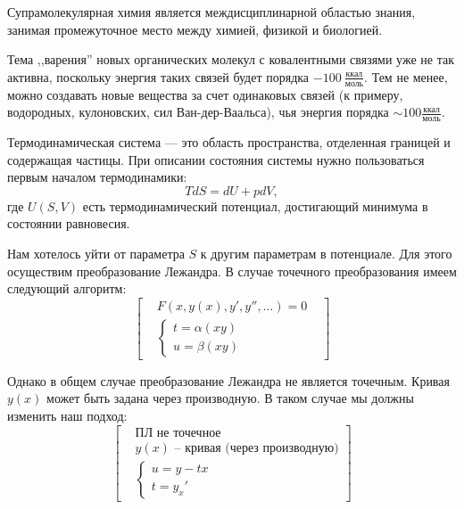 
\begin{lecture}
	Супрамолекулярная химия является междисциплинарной областью знания, занимая промежуточное место между химией, физикой и биологией.
		
	Тема ,,варения'' новых органических молекул с ковалентными связями уже не так активна, поскольку энергия таких связей будет порядка $-100~\frac{\text{ккал}}{\text{моль}}$.
    Тем не менее, можно создавать новые вещества за счет одинаковых связей (к примеру, водородных, кулоновских, сил Ван-дер-Ваальса), чья энергия порядка
    $ \sim 100 \frac{\text{ккал}}{\text{моль}}$.
    
    Термодинамическая система --- это область пространства, отделенная границей и содержащая частицы.
    При описании состояния системы нужно пользоваться первым началом термодинамики:
    \begin{equation}
    	T dS = dU + p dV,
    	\label{eq:first_statement_therm}
    \end{equation}
    где $U (S, V)$ есть термодинамический потенциал, достигающий минимума в состоянии равновесия.
    
    Нам хотелось уйти от параметра $S$ к другим параметрам в потенциале. Для этого осуществим преобразование Лежандра. В случае точечного преобразования имеем следующий алгоритм:
    \begin{equation}
    	\begin{bmatrix}
			&F( x, y(x), y', y'', \dots ) = 0 & \\
			&\begin{cases}
				t = \alpha (xy) \\
				u = \beta (xy)
			\end{cases}
		\end{bmatrix}
		\label{eq:dot_lejandr}
    \end{equation}
    
    Однако в общем случае преобразование Лежандра не является точечным. Кривая $ y(x) $ может быть задана через производную. В таком случае мы должны изменить наш подход:
    \begin{equation}
    	\begin{bmatrix}
    		&\text{ПЛ не точечное} \\
    		&y(x) \text{ -- кривая (через производную)} \\
    		&\begin{cases}
    			u = y - tx \\
    			t = y_x'
    		\end{cases}
    	\end{bmatrix}
    \end{equation}
    

\end{lecture}

